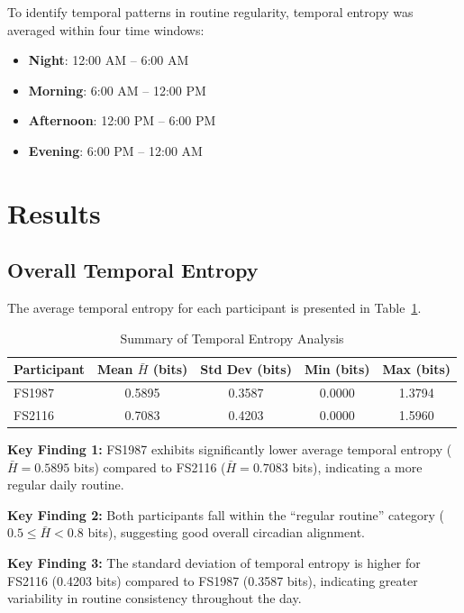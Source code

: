 \documentclass[12pt,letterpaper]{article}
\begin{document}
To identify temporal patterns in routine regularity, temporal entropy was averaged within four time windows:

\begin{itemize}
    \item \textbf{Night}: 12:00 AM -- 6:00 AM
    \item \textbf{Morning}: 6:00 AM -- 12:00 PM
    \item \textbf{Afternoon}: 12:00 PM -- 6:00 PM
    \item \textbf{Evening}: 6:00 PM -- 12:00 AM
\end{itemize}

\section{Results}

\subsection{Overall Temporal Entropy}

The average temporal entropy for each participant is presented in Table~\ref{tab:entropy_summary}.

\begin{table}[H]
\centering
\caption{Summary of Temporal Entropy Analysis}
\label{tab:entropy_summary}
\begin{tabular}{lcccc}
\toprule
\textbf{Participant} & \textbf{Mean $\bar{H}$ (bits)} & \textbf{Std Dev (bits)} & \textbf{Min (bits)} & \textbf{Max (bits)} \\
\midrule
FS1987 & 0.5895 & 0.3587 & 0.0000 & 1.3794 \\
FS2116 & 0.7083 & 0.4203 & 0.0000 & 1.5960 \\
\bottomrule
\end{tabular}
\end{table}

\textbf{Key Finding 1:} FS1987 exhibits significantly lower average temporal entropy ($\bar{H} = 0.5895$ bits) compared to FS2116 ($\bar{H} = 0.7083$ bits), indicating a more regular daily routine.

\textbf{Key Finding 2:} Both participants fall within the ``regular routine'' category ($0.5 \leq \bar{H} < 0.8$ bits), suggesting good overall circadian alignment.

\textbf{Key Finding 3:} The standard deviation of temporal entropy is higher for FS2116 (0.4203 bits) compared to FS1987 (0.3587 bits), indicating greater variability in routine consistency throughout the day.
\end{document}
